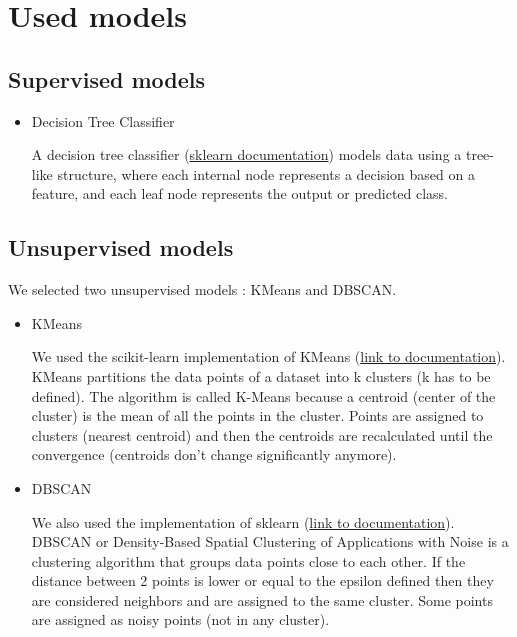 \documentclass[10pt, a4paper]{article}
\begin{document}
\section{Used models}
\subsection{Supervised models}

\begin{itemize}
    \item Decision Tree Classifier
    
    A decision tree classifier (\href{https://scikit-learn.org/stable/modules/generated/sklearn.tree.DecisionTreeClassifier.html#sklearn.tree.DecisionTreeClassifier}{sklearn documentation}) models data using a tree-like structure, where each internal node represents a decision based on a feature, and each leaf node represents the output or predicted class.
\end{itemize}

\subsection{Unsupervised models}
We selected two unsupervised models : KMeans and DBSCAN.
\begin{itemize}
    \item KMeans
    
    We used the scikit-learn implementation of KMeans (\href{https://scikit-learn.org/stable/modules/generated/sklearn.cluster.KMeans.html#sklearn.cluster.KMeans}{link to documentation}). KMeans partitions the data points of a dataset into k clusters (k has to be defined). The algorithm is called K-Means because a centroid (center of the cluster) is the mean of all the points in the cluster. Points are assigned to clusters (nearest centroid) and then the centroids are recalculated until the convergence (centroids don't change significantly anymore).


    \item DBSCAN
    
    We also used the implementation of sklearn (\href{https://scikit-learn.org/stable/modules/generated/sklearn.cluster.DBSCAN.html}{link to documentation}). DBSCAN or Density-Based Spatial Clustering of Applications with Noise is a clustering algorithm that groups data points close to each other. If the distance between 2 points is lower or equal to the epsilon defined then they are considered neighbors and are assigned to the same cluster. Some points are assigned as noisy points (not in any cluster).
\end{itemize}
\newpage
\end{document}
